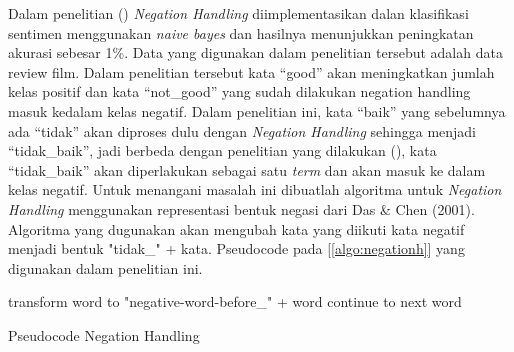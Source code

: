 Dalam penelitian \citeauthor{NARAYANAN2013} (\cite*{NARAYANAN2013}) \textit{Negation Handling} diimplementasikan dalan klasifikasi sentimen menggunakan \textit{naive bayes} dan hasilnya menunjukkan peningkatan akurasi sebesar 1\%. Data yang digunakan dalam penelitian tersebut adalah data review film. Dalam penelitian tersebut kata “good” akan meningkatkan jumlah kelas positif dan kata “not\_good” yang sudah dilakukan negation handling masuk kedalam kelas negatif.
Dalam penelitian ini, kata “baik” yang sebelumnya ada “tidak” akan diproses dulu dengan \textit{Negation Handling} sehingga menjadi “tidak\_baik”, jadi berbeda dengan penelitian yang dilakukan \citeauthor{NARAYANAN2013} (\cite*{NARAYANAN2013}), kata “tidak\_baik” akan diperlakukan sebagai satu \textit{term} dan akan masuk ke dalam kelas negatif. Untuk menangani masalah ini dibuatlah algoritma untuk \textit{Negation Handling} menggunakan representasi bentuk negasi dari Das \& Chen (2001). Algoritma yang dugunakan akan mengubah kata yang diikuti kata negatif menjadi bentuk "tidak\_" + kata. Pseudocode pada [\ref{algo:negationh}] yang digunakan dalam penelitian ini.

\begin{algorithm}
	\DontPrintSemicolon %
	 {
		 {
			transform word to "negative-word-before\_" + word
		}
		 {
			continue to next word 
		}
	}
	
	\caption{Pseudocode Negation Handling}
	\label{algo:negationh}
\end{algorithm}

